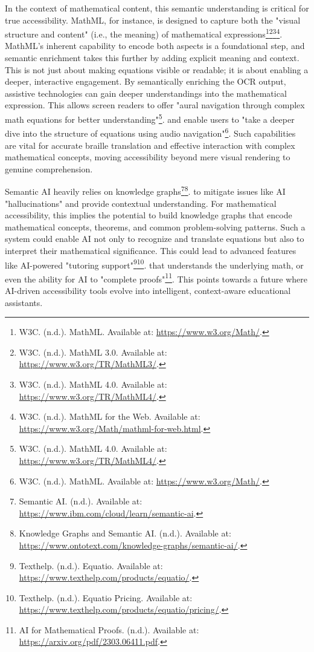 In the context of mathematical content, this semantic understanding is critical for true accessibility. MathML, for instance, is designed to capture both the "visual structure and content" (i.e., the meaning) of mathematical expressions\footnote{W3C. (n.d.). MathML. Available at: \url{https://www.w3.org/Math/}.}\footnote{W3C. (n.d.). MathML 3.0. Available at: \url{https://www.w3.org/TR/MathML3/}.}\footnote{W3C. (n.d.). MathML 4.0. Available at: \url{https://www.w3.org/TR/MathML4/}.}\footnote{W3C. (n.d.). MathML for the Web. Available at: \url{https://www.w3.org/Math/mathml-for-web.html}.}. MathML's inherent capability to encode both aspects is a foundational step, and semantic enrichment takes this further by adding explicit meaning and context. This is not just about making equations visible or readable; it is about enabling a deeper, interactive engagement. By semantically enriching the OCR output, assistive technologies can gain deeper understandings into the mathematical expression. This allows screen readers to offer "aural navigation through complex math equations for better understanding"\footnote{W3C. (n.d.). MathML 4.0. Available at: \url{https://www.w3.org/TR/MathML4/}.}. and enable users to "take a deeper dive into the structure of equations using audio navigation"\footnote{W3C. (n.d.). MathML. Available at: \url{https://www.w3.org/Math/}.}. Such capabilities are vital for accurate braille translation and effective interaction with complex mathematical concepts, moving accessibility beyond mere visual rendering to genuine comprehension.

Semantic AI heavily relies on knowledge graphs\footnote{Semantic AI. (n.d.). Available at: \url{https://www.ibm.com/cloud/learn/semantic-ai}.}\footnote{Knowledge Graphs and Semantic AI. (n.d.). Available at: \url{https://www.ontotext.com/knowledge-graphs/semantic-ai/}.}. to mitigate issues like AI "hallucinations" and provide contextual understanding. For mathematical accessibility, this implies the potential to build knowledge graphs that encode mathematical concepts, theorems, and common problem-solving patterns. Such a system could enable AI not only to recognize and translate equations but also to interpret their mathematical significance. This could lead to advanced features like AI-powered "tutoring support"\footnote{Texthelp. (n.d.). Equatio. Available at: \url{https://www.texthelp.com/products/equatio/}.}\footnote{Texthelp. (n.d.). Equatio Pricing. Available at: \url{https://www.texthelp.com/products/equatio/pricing/}.}. that understands the underlying math, or even the ability for AI to "complete proofs"\footnote{AI for Mathematical Proofs. (n.d.). Available at: \url{https://arxiv.org/pdf/2303.06411.pdf}.}. This points towards a future where AI-driven accessibility tools evolve into intelligent, context-aware educational assistants.

